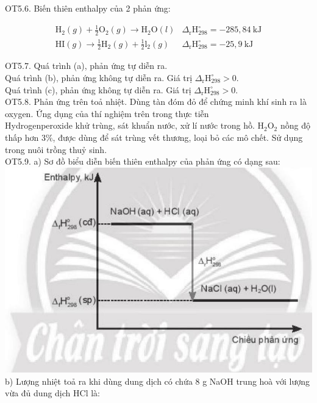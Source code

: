 \documentclass[10pt]{article}
\begin{document}
OT5.6. Biến thiên enthalpy của 2 phản ứng:

$$
\begin{array}{ll}
\mathrm{H}_{2}(g)+\frac{1}{2} \mathrm{O}_{2}(g) \rightarrow \mathrm{H}_{2} \mathrm{O}(l) & \Delta_{\mathrm{r}} \mathrm{H}_{298}^{\circ}=-285,84 \mathrm{~kJ} \\
\mathrm{HI}(g) \rightarrow \frac{1}{2} \mathrm{H}_{2}(g)+\frac{1}{2} \mathrm{l}_{2}(g) & \Delta_{\mathrm{r}} \mathrm{H}_{298}^{\circ}=-25,9 \mathrm{~kJ}
\end{array}
$$

OT5.7. Quá trình (a), phản ứng tự diễn ra.\\
Quá trình (b), phản ứng không tự diễn ra. Giá trị $\Delta_{\mathrm{r}} \mathrm{H}_{298}^{\circ}>0$.\\
Quá trình (c), phản ứng không tự diễn ra. Giá trị $\Delta_{\mathrm{r}} \mathrm{H}_{298}^{\circ}>0$.\\
OT5.8. Phản ứng trên toả nhiệt. Dùng tàn đóm đỏ để chứng minh khí sinh ra là oxygen. Ứng dụng của thí nghiệm trên trong thực tiễn\\
Hydrogenperoxide khử trùng, sát khuẩn nước, xử lí nước trong hồ. $\mathrm{H}_{2} \mathrm{O}_{2}$ nồng độ thấp hơn $3 \%$, được dùng để sát trùng vết thương, loại bỏ các mô chết. Sử dụng trong nuôi trồng thuỷ sinh.\\
OT5.9. a) Sơ đồ biểu diễn biến thiên enthalpy của phản ứng có dạng sau:\\
\includegraphics[max width=\textwidth, center]{2025_10_23_57761e23b8c46a11c3efg-46}\\
b) Lượng nhiệt toả ra khi dùng dung dịch có chứa 8 g NaOH trung hoà với lượng vừa đủ dung dịch HCl là:
\end{document}
